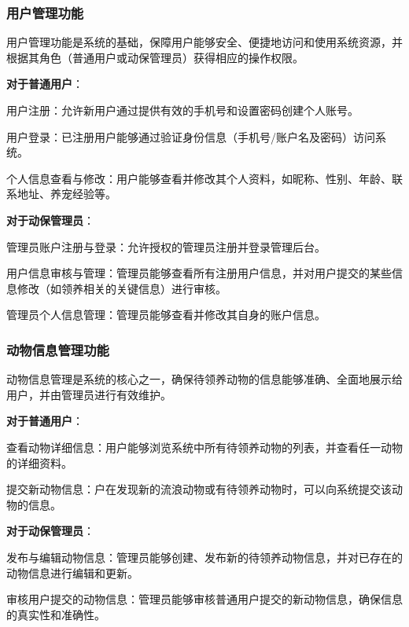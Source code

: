 \documentclass[12pt,a4paper,UTF8]{article}
\begin{document}
\subsubsection{用户管理功能}

用户管理功能是系统的基础，保障用户能够安全、便捷地访问和使用系统资源，并根据其角色（普通用户或动保管理员）获得相应的操作权限。

\vspace{0.25cm}

\noindent\textbf{对于普通用户}：

用户注册：允许新用户通过提供有效的手机号和设置密码创建个人账号。

用户登录：已注册用户能够通过验证身份信息（手机号/账户名及密码）访问系统。

个人信息查看与修改：用户能够查看并修改其个人资料，如昵称、性别、年龄、联系地址、养宠经验等。

\vspace{0.25cm}

\noindent\textbf{对于动保管理员}：

管理员账户注册与登录：允许授权的管理员注册并登录管理后台。

用户信息审核与管理：管理员能够查看所有注册用户信息，并对用户提交的某些信息修改（如领养相关的关键信息）进行审核。

管理员个人信息管理：管理员能够查看并修改其自身的账户信息。

\subsubsection{动物信息管理功能}

动物信息管理是系统的核心之一，确保待领养动物的信息能够准确、全面地展示给用户，并由管理员进行有效维护。

\vspace{0.25cm}

\noindent\textbf{对于普通用户}：

查看动物详细信息：用户能够浏览系统中所有待领养动物的列表，并查看任一动物的详细资料。

提交新动物信息：户在发现新的流浪动物或有待领养动物时，可以向系统提交该动物的信息。

\vspace{0.25cm}

\noindent\textbf{对于动保管理员}：

发布与编辑动物信息：管理员能够创建、发布新的待领养动物信息，并对已存在的动物信息进行编辑和更新。

审核用户提交的动物信息：管理员能够审核普通用户提交的新动物信息，确保信息的真实性和准确性。
\end{document}
